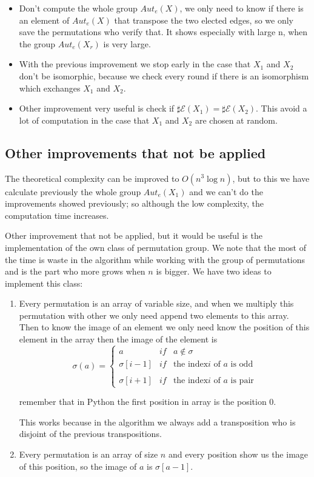 \documentclass[12pt,a4paper]{book}
\theoremstyle{plain}
\theoremstyle{definition}
\theoremstyle{remark}
\begin{document}
\begin{itemize}
 \item Don't compute the whole group $Aut_e(X)$, we only need to know if there is an element of $Aut_e(X)$ that transpose the two 
 elected edges, so we only save the permutations who verify that. It shows especially with large n, when the group $Aut_e(X_r)$ is 
 very large. 
 \item With the previous improvement we stop early in the case that $X_1$ and $X_2$ don't be isomorphic,  because we check every round 
 if there is an isomorphism which exchanges $X_1$ and $X_2$.
 \item Other improvement very useful is check if $\sharp \mathcal{E}(X_1)= \sharp \mathcal{E}(X_2)$. This avoid a lot of computation 
 in the case that $X_1$ and $X_2$ are chosen at random.
 \end{itemize}

\subsection{Other improvements that not be applied}

The theoretical complexity can be improved to $O(n^3 \log n)$, but to this we have calculate previously  the whole group $Aut_e(X_1)$ and
 we can't do the improvements showed previously;  so although the low complexity, the computation time increases. 
 
 Other improvement that not be applied, but it would be useful is the implementation of the own class of permutation group. We 
 note that the most of the time is waste  in the algorithm  while  working with the group of permutations and is the part who more grows 
 when $n$ is bigger. We have two ideas to implement this class:
 \begin{enumerate}
  \item Every permutation is an array of variable size, and when we multiply this permutation with other we only need append two 
  elements to this array. Then to know the image of an element we only need know the position of this element in the array then the 
  image of the element is
 \[
   \sigma (a) = \left\lbrace \begin{array}{lcl} a & if & a \notin \sigma \\ \sigma[i-1] & if & \mbox{the index} i \mbox{ of } a \mbox{ is odd}\\                              \\
                              \sigma[i+1] & if & \mbox{the index} i \mbox{ of } a \mbox{ is pair} 
                              
                             \end{array} \right.
  \]

  remember that in Python the first position in array is the position 0.

This works because in the algorithm we always add a transposition who is disjoint of the previous transpositions.
\item Every permutation is an array of size $n$ and every position show us the image of this position, so the image of $a$ is 
$\sigma[a-1]$.
 \end{enumerate}
\end{document}
